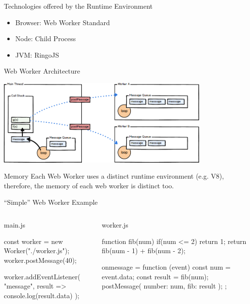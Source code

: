 \begin{frame}{Technologies offered by the Runtime Environment}
	\begin{itemize}
		\item Browser: Web Worker Standard~\cite{w3cWebWorker}
		\item Node: Child Process~\cite{childProcess}
		\item JVM: RingoJS~\cite{RingoJS}
	\end{itemize}
\end{frame}

\begin{frame}{Web Worker Architecture}
	\begin{center}
		\includegraphics[width=0.8\textwidth]{web-workers}~\cite{Swenson-Healey2013}
	\end{center}
	
	\begin{alertblock}{Memory}
		Each Web Worker uses a distinct runtime environment (e.g. V8), therefore, the memory of each web worker is distinct too.
	\end{alertblock}

\end{frame}

\begin{frame}[fragile]{\enquote{Simple} Web Worker Example}
	\begin{columns}[t]
		\begin{column}{0.56\textwidth}
			\begin{block}{main.js}
				\begin{javascriptcode}
const worker = new Worker("./worker.js");
worker.postMessage(40);

worker.addEventListener(
	"message", 
	result => console.log(result.data)
);
				\end{javascriptcode}
			\end{block}
		\end{column}
		\pause
		\begin{column}{0.44\textwidth}
			\begin{block}{worker.js}
				\begin{javascriptcode}
function fib(num) {
	if(num <= 2) {
		return 1;
	}
	return fib(num - 1) + fib(num - 2);
}

onmessage = function (event) {
	const num = event.data;
	const result = fib(num);
	postMessage({ 
		number: num, 
		fib: result 
	});
};	
				\end{javascriptcode}
			\end{block}
		\end{column}

	\end{columns}

\end{frame}

